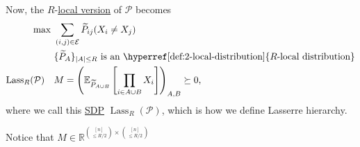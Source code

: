 Now, the \(R\)-\hyperref[def:local-distribution]{local version} of \(\mathcal{P} \) becomes
\[
	\begin{aligned}
		\max~                                                & \sum_{(i, j)\in \mathcal{E} } \widetilde{P} _{ij} (X_i \neq X_j)                                                                   \\
		                                                     & \{\widetilde{P} _A\}_{\left\vert A \right\vert \leq R} \text{ is an \hyperref[def:2-local-distribution]{\(R\)-local distribution}} \\
		\mathop{\mathrm{Lass}}\nolimits_R(\mathcal{P} )\quad & M = \left( \mathbb{E}_{\widetilde{P} _{A \cup B}} \left[ \prod_{i\in A \cup B} X_i \right] \right) _{A, B}\succeq 0,
	\end{aligned}
\]
where we call this \hyperref[def:SDP]{SDP} \(\mathop{\mathrm{Lass}}_R(\mathcal{P} )\), which is how we define Lasserre hierarchy.

\begin{note}
	Notice that \(M\in \mathbb{R} ^{\binom{[n]}{\leq R / 2} \times \binom{[n]}{\leq R / 2}}\)
\end{note}